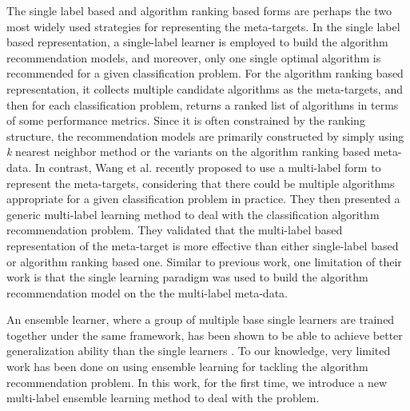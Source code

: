 \documentclass[prodmode,acmtkdd]{acmsmall}
\begin{document}




The single label based \cite{ali2006learning,kalousis2002algorithm,kalousis2004data}
and algorithm ranking based \cite{brazdil2003ranking,song2012automatic} forms are perhaps the two most widely used strategies for representing the meta-targets.
In the single label based representation,
a single-label learner is employed to build the algorithm recommendation models,
and moreover, only one single optimal algorithm is recommended for a given classification problem.
For the algorithm ranking based representation,
it collects multiple candidate algorithms as the meta-targets,
and then for each classification problem, returns a ranked list of algorithms in terms of some performance metrics.
Since it is often constrained by the ranking structure,
the recommendation models are primarily constructed by simply using \emph{k} nearest neighbor method or the variants on the algorithm ranking based meta-data.
In contrast,
Wang et al. \cite{wang2014generic} recently proposed to use a multi-label form to represent the meta-targets,
considering that there could be multiple algorithms appropriate for a given classification problem in practice.
They then presented a generic multi-label learning method to deal with the classification algorithm recommendation problem.
They validated that
the multi-label based representation of the meta-target is more effective than either single-label based or algorithm ranking based one.
Similar to previous work,
one limitation of their work is that
the single learning paradigm was used to build the algorithm recommendation model on the the multi-label meta-data.




An ensemble learner, where a group of multiple base single learners are trained together under the same framework, 
has been shown to be able to achieve better generalization ability than the single learners
\cite{dietterichl2002ensemble,dvzeroski2004combining}. 
To our knowledge, very limited work has been done on using ensemble learning for tackling the algorithm recommendation problem.
In this work, for the first time, we introduce a new multi-label ensemble learning method to deal with the problem. 
\end{document}
